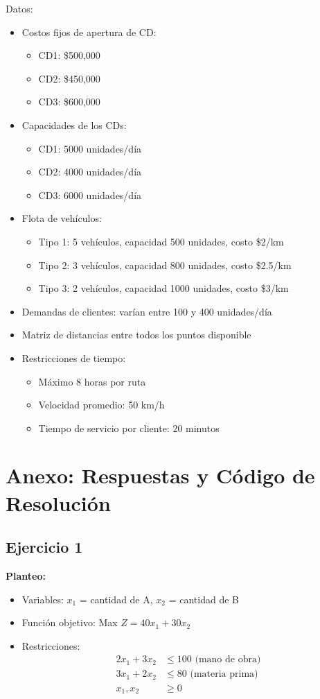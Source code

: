 \documentclass[12pt]{article}
\begin{document}
\begin{enumerate}
Datos:
\begin{itemize}
\item Costos fijos de apertura de CD:
  \begin{itemize}
  \item CD1: \$500,000
  \item CD2: \$450,000
  \item CD3: \$600,000
  \end{itemize}
\item Capacidades de los CDs:
  \begin{itemize}
  \item CD1: 5000 unidades/día
  \item CD2: 4000 unidades/día
  \item CD3: 6000 unidades/día
  \end{itemize}
\item Flota de vehículos:
  \begin{itemize}
  \item Tipo 1: 5 vehículos, capacidad 500 unidades, costo \$2/km
  \item Tipo 2: 3 vehículos, capacidad 800 unidades, costo \$2.5/km
  \item Tipo 3: 2 vehículos, capacidad 1000 unidades, costo \$3/km
  \end{itemize}
\item Demandas de clientes: varían entre 100 y 400 unidades/día
\item Matriz de distancias entre todos los puntos disponible
\item Restricciones de tiempo:
  \begin{itemize}
  \item Máximo 8 horas por ruta
  \item Velocidad promedio: 50 km/h
  \item Tiempo de servicio por cliente: 20 minutos
  \end{itemize}
\end{itemize}

\newpage

\section*{Anexo: Respuestas y Código de Resolución}

\subsection*{Ejercicio 1}

\textbf{Planteo:}
\begin{itemize}
\item Variables: $x_1$ = cantidad de A, $x_2$ = cantidad de B
\item Función objetivo: Max $Z = 40x_1 + 30x_2$
\item Restricciones:
  \begin{align*}
  2x_1 + 3x_2 &\leq 100 \text{ (mano de obra)} \\
  3x_1 + 2x_2 &\leq 80 \text{ (materia prima)} \\
  x_1, x_2 &\geq 0
  \end{align*}
\end{itemize}


\end{enumerate}
\end{document}
